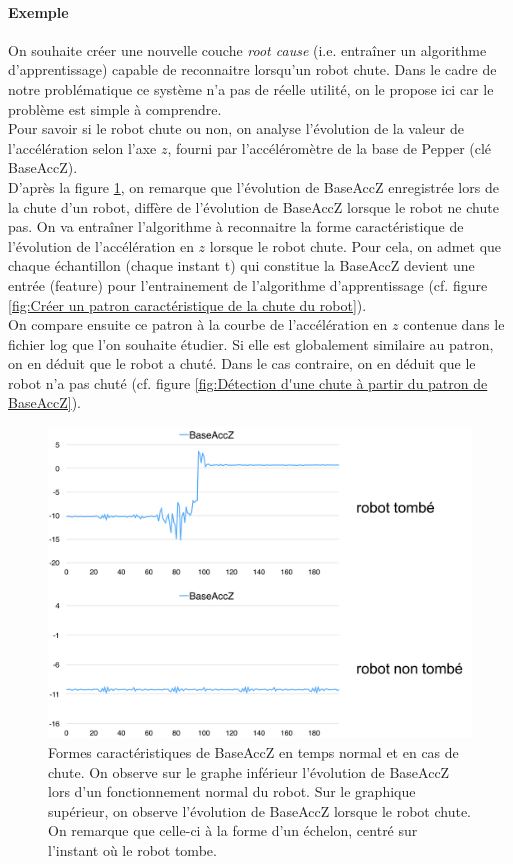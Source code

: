 \paragraph{Exemple} On souhaite créer une nouvelle couche \emph{root cause} (i.e. entraîner un algorithme d'apprentissage) capable de reconnaitre lorsqu'un robot chute. Dans le cadre de notre problématique ce système n'a pas de réelle utilité, on le propose ici car le problème est simple à comprendre. \\
Pour savoir si le robot chute ou non, on analyse l'évolution de la valeur de l'accélération selon l'axe $z$, fourni par l'accéléromètre de la base de Pepper (clé BaseAccZ). \\
D'après la figure \ref{fig:Formes caractéristiques de BaseAccZ en temps normal et en cas de chute}, on remarque que l'évolution de BaseAccZ enregistrée lors de la chute d'un robot, diffère de l'évolution de BaseAccZ lorsque le robot ne chute pas. On va entraîner l'algorithme à reconnaitre la forme caractéristique de l'évolution de l'accélération en $z$ lorsque le robot chute. Pour cela, on admet que chaque échantillon (chaque instant t) qui constitue la BaseAccZ devient une entrée (feature) pour l'entrainement de l'algorithme d'apprentissage (cf. figure \ref{fig:Créer un patron caractéristique de la chute du robot}). \\
On compare ensuite ce patron à la courbe de l'accélération en $z$ contenue dans le fichier log que l'on souhaite étudier. Si elle est globalement similaire au patron, on en déduit que le robot a chuté. Dans le cas contraire, on en déduit que le robot n'a pas chuté (cf. figure \ref{fig:Détection d'une chute à partir du patron de BaseAccZ}).

\begin{figure}[h]
	\centering\includegraphics[width=12cm]{images/fall_not_fall.png}
	\caption[Formes caractéristiques de BaseAccZ en temps normal et en cas de chute]{Formes caractéristiques de BaseAccZ en temps normal et en cas de chute. On observe sur le graphe inférieur l'évolution de BaseAccZ lors d'un fonctionnement normal du robot. Sur le graphique supérieur, on observe l'évolution de BaseAccZ lorsque le robot chute. On remarque que celle-ci à la forme d'un échelon, centré sur l'instant où le robot tombe.}
	\label{fig:Formes caractéristiques de BaseAccZ en temps normal et en cas de chute}
\end{figure}

